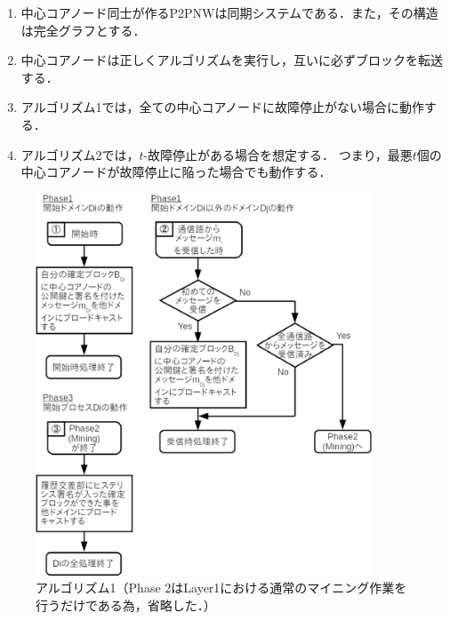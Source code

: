\documentclass[a4paper,12pt]{jsarticle}
\begin{document}
\hspace{3mm}
%
\begin{enumerate}
    \item 中心コアノード同士が作るP2PNWは同期システムである．また，その構造は完全グラフとする．
    
    \item 中心コアノードは正しくアルゴリズムを実行し，互いに必ずブロックを転送する．
    
    \item アルゴリズム1では，全ての中心コアノードに故障停止がない場合に動作する．
    
    \item アルゴリズム2では，$t$-故障停止がある場合を想定する．
        つまり，最悪$t$個の中心コアノードが故障停止に陥った場合でも動作する．
\end{enumerate}
%
\hspace{3mm}
%
\begin{figure}[H]%
  \begin{center}
    \includegraphics[width=100mm]{pht/flow_chart-algorithm1.eps}
  \end{center}
  \caption{アルゴリズム1（Phase 2はLayer1における通常のマイニング作業を行うだけである為，省略した．）}
  \label{fig:algorithm1}
\end{figure}
%
%
\end{document}
